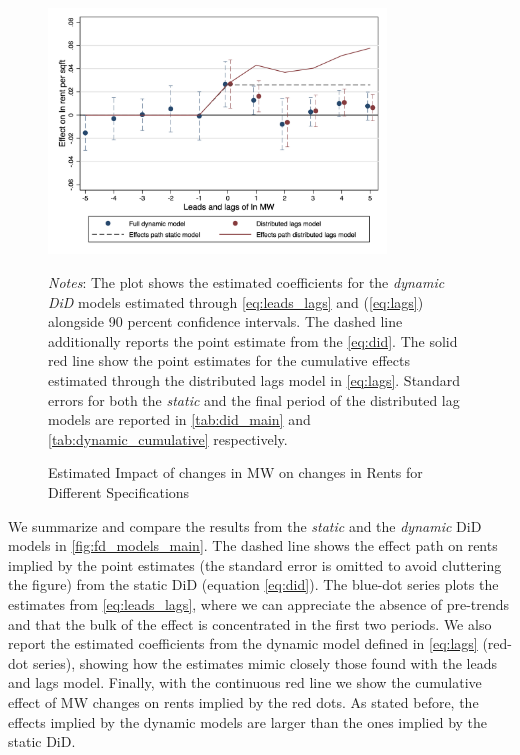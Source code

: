 \begin{figure}
    \caption{Estimated Impact of changes in MW on changes in Rents for Different Specifications}
    \label{fig:fd_models_main}
    \centering
    \includegraphics[width = 0.8\textwidth]{../../analysis/first_differences/output/fd_models.png}
    \begin{minipage}{0.95\textwidth} \footnotesize
		\vspace{2mm} 
		\textit{Notes}: The plot shows the estimated coefficients for the \textit{dynamic DiD} 
		models estimated through \autoref{eq:leads_lags} and (\ref{eq:lags}) alongside 90 percent 
		confidence intervals. The dashed line additionally reports the point estimate from the 
		\autoref{eq:did}. The solid red line show the point estimates for the cumulative effects 
		estimated through the distributed lags model in \autoref{eq:lags}. Standard errors for both 
		the \textit{static} and the final period of the distributed lag models are reported in 
		\autoref{tab:did_main} and \autoref{tab:dynamic_cumulative} respectively. 
	\end{minipage}
\end{figure}

We summarize and compare the results from the \textit{static} and the \textit{dynamic} DiD models 
in \autoref{fig:fd_models_main}. The dashed line shows the effect path on rents implied by the 
point estimates (the standard error is omitted to avoid cluttering the figure) from the static DiD 
(equation \ref{eq:did}). The blue-dot series plots the estimates from \autoref{eq:leads_lags}, where 
we can appreciate the absence of pre-trends and that the bulk of the effect is concentrated in the 
first two periods. We also report the estimated coefficients from the dynamic model defined in 
\autoref{eq:lags} (red-dot series), showing how the estimates mimic closely those found with the 
leads and lags model. Finally, with the continuous red line we show the cumulative effect of MW 
changes on rents implied by the red dots. As stated before, the effects implied by the dynamic models 
are larger than the ones implied by the static DiD.

